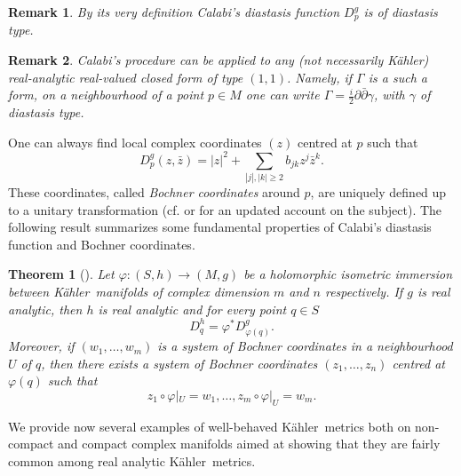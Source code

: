 \documentclass[12pt]{amsart}
\newcommand{\K}{K\"{a}hler}
\newtheorem{theor}{Theorem}
\newtheorem{remark}{Remark}
\begin{document}
\begin{remark}\label{remdefdiast}\rm
	By its very definition Calabi's diastasis function $D_p^g$ is of diastasis type.
\end{remark}

\begin{remark}\label{locexp(1,1)}\rm
	Calabi's procedure can 
	be applied to any (not necessarily \K) real-analytic real-valued  closed form of type $(1, 1)$. Namely, if $\Gamma$ is a such a form, on a neighbourhood of a point $p\in M$ one can write
	$\Gamma =\frac{i}{2}\partial\bar\partial \gamma$,  with $\gamma$ of diastasis type.
\end{remark}
One can always find  local complex coordinates  $(z)$ centred at $p$ such that
$$D^g_p(z, \bar z)=|z|^2+\sum _{|j|, |k|\geq 2} b_{jk}z^j\bar z^k.$$
These coordinates, called {\em Bochner coordinates}
around $p$, are 
uniquely defined up
to a unitary transformation
(cf. \cite{Bochner47coordinates,Calabi53Isometric} or \cite{Loi18Book} for an updated account on the subject).
The following result  summarizes some fundamental properties of Calabi's diastasis function and Bochner coordinates.

 \begin{theor}[\cite{Calabi53Isometric}]\label{ThmCalabi}
  Let $\varphi :(S, h)\rightarrow (M, g)$ be a holomorphic isometric immersion between \K\ manifolds of complex dimension $m$ and $n$ respectively.
 If $g$ is real analytic, then $h$ is real analytic and for every point $q\in S$ 
 $$D^h_q=\varphi ^*D^g_{\varphi (q)}.$$ 
 Moreover, if $(w_1,\dots ,w_m)$ is a system of Bochner coordinates in a neighbourhood $U$ of $q$, then there exists a system of Bochner coordinates $(z_1,\dots ,z_n)$ centred at $\varphi (q)$ such that
 \begin{equation}\label{zandZ}
 	z_1\circ \varphi |_{U}=w_1,\dots , z_m\circ \varphi |_{U}=w_m.
 \end{equation}
 \end{theor}
We provide now several examples of well-behaved \K\ metrics both on non-compact and compact complex manifolds aimed at showing that they are fairly common among real analytic \K\ metrics.
\end{document}
